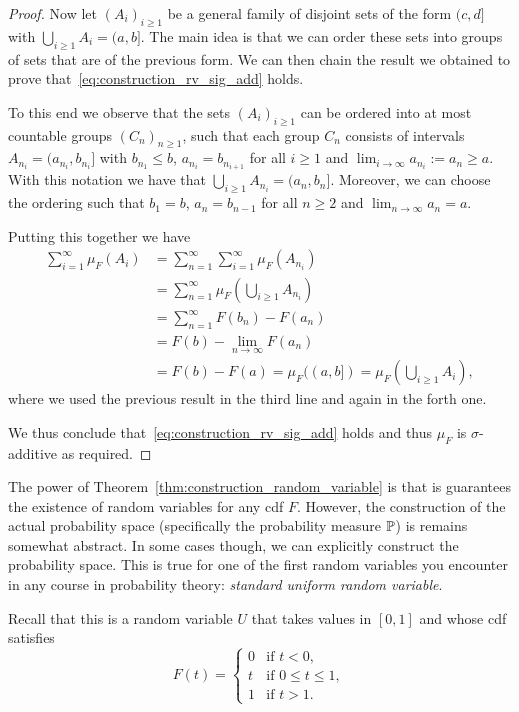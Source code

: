 \begin{proof}
Now let $(A_i)_{i \ge 1}$ be a general family of disjoint sets of the form $(c,d]$ with $\bigcup_{i \ge 1} A_i = (a, b]$. The main idea is that we can order these sets into groups of sets that are of the previous form. We can then chain the result we obtained to prove that~\eqref{eq:construction_rv_sig_add} holds.

To this end we observe that the sets $(A_i)_{i \ge 1}$ can be ordered into at most countable groups $(C_n)_{n \ge 1}$, such that each group $C_n$ consists of intervals $A_{n_i} = (a_{n_i}, b_{n_i}]$ with $b_{n_1} \le b$, $a_{n_{i}} = b_{n_{i+1}}$ for all $i \ge 1$ and $\lim_{i \to \infty} a_{n_i} := a_n \ge a$. With this notation we have that $\bigcup_{i \ge 1} A_{n_i} = (a_n, b_n]$. Moreover, we can choose the ordering such that $b_1 = b$, $a_n = b_{n-1}$ for all $n \ge 2$ and $\lim_{n \to \infty} a_n = a$.

Putting this together we have
\begin{align*}
	\sum_{i = 1}^\infty \mu_F(A_i) &= \sum_{n = 1}^\infty \sum_{i = 1}^\infty \mu_F(A_{n_i}) \\
	&= \sum_{n = 1}^\infty \mu_F(\bigcup_{i \ge 1} A_{n_i})\\
	&= \sum_{n = 1}^\infty F(b_n) - F(a_n) \\
	&= F(b) - \lim_{n \to \infty} F(a_n) \\
	&= F(b) - F(a) = \mu_F((a,b]) = \mu_F(\bigcup_{i \ge 1} A_i),
\end{align*}
where we used the previous result in the third line and again in the forth one.

We thus conclude that~\eqref{eq:construction_rv_sig_add} holds and thus $\mu_F$ is $\sigma$-additive as required.

\end{proof}


The power of Theorem~\ref{thm:construction_random_variable} is that is guarantees the existence of random variables for any cdf $F$. However, the construction of the actual probability space (specifically the probability measure $\mathbb P$) is remains somewhat abstract. In some cases though, we can explicitly construct the probability space. This is true for one of the first random variables you encounter in any course in probability theory: \emph{standard uniform random variable}. 

Recall that this is a random variable $U$ that takes values in $[0,1]$ and whose cdf satisfies 
\begin{equation}\label{eq:cdf_uniform_rv}
	F(t) = \begin{cases}
		0 &\text{if } t < 0,\\
		t &\text{if } 0 \le t\le 1,\\
		1 &\text{if } t > 1.
	\end{cases}
\end{equation}

